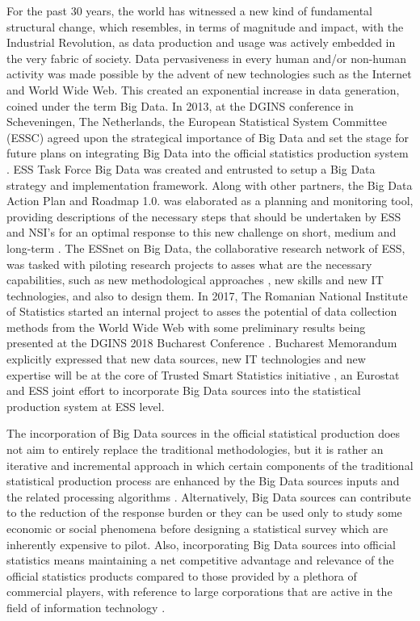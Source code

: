 \documentclass[]{article}
\begin{document}
For the past 30 years, the world has witnessed a new kind of fundamental structural change, which resembles, in terms of magnitude and impact, with the Industrial Revolution, as data production and usage was actively embedded in the very fabric of society. Data pervasiveness in every human and/or non-human activity was made possible by the advent of new technologies such as the Internet and World Wide Web. This created an exponential increase in data generation, coined under the term Big Data. In 2013, at the DGINS conference in Scheveningen, The Netherlands, the European Statistical System  Committee (ESSC) agreed upon the strategical importance of Big Data and set the stage for future plans on integrating Big Data into the official statistics production system \cite{mschv}. ESS Task Force Big Data was created and entrusted to setup a Big Data strategy and implementation framework. Along with other partners, the Big Data Action Plan and Roadmap 1.0. was elaborated as a planning and monitoring tool, providing descriptions of the necessary steps that should be undertaken by ESS and NSI's for an optimal response to this new challenge on short, medium and long-term \cite{bdar}. The ESSnet on Big Data, the collaborative research network of ESS, was tasked with piloting research projects \cite{awirth_1} to asses what are the necessary capabilities, such as new methodological approaches \cite{fricc}, new skills and new IT technologies, and also to design them. In 2017, The Romanian National Institute of Statistics started an internal project to asses the potential of data collection methods from the World Wide Web with some preliminary results being presented at the DGINS 2018 Bucharest Conference \cite{oancea}. Bucharest Memorandum \cite{mbch} explicitly expressed that new data sources, new IT technologies and new expertise will be at the core of Trusted Smart Statistics initiative \cite{ricwirskagiarei, awirth_2}, an Eurostat and ESS joint effort to incorporate Big Data sources into the statistical production system at ESS level.

The incorporation of Big Data sources in the official statistical production does not aim to entirely replace the traditional methodologies, but it is rather an iterative and incremental approach in which certain components of the traditional statistical production process are enhanced by the Big Data sources inputs and the related processing algorithms \cite{grif2016_1, grif2016_2}. Alternatively, Big Data sources can contribute to the reduction of the response burden or they can be used only to study some economic or social phenomena before designing a statistical survey which are inherently expensive to pilot. Also, incorporating Big Data sources into official statistics means maintaining a net competitive advantage and relevance of the official statistics products compared to those provided by a plethora of commercial players, with reference to large corporations that are active in the field of information technology \cite{eu2012}.
\end{document}
